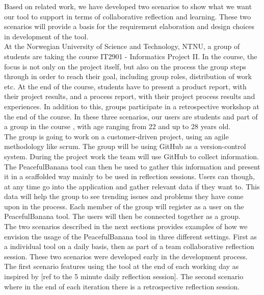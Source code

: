 Based on related work, we have developed two scenarios to show what we want our tool to support in terms of collaborative reflection and learning. These two scenarios will provide a basis for the requirement elaboration and design choices in development of the tool. 
\\
At the Norwegian University of Science and Technology, NTNU, a group of students are taking the course IT2901 - Informatics Project II\footnotemark.
In the course, the focus is not only on the project itself, but also on the process the group steps through in order to reach their goal, including group roles, distribution of work etc. At the end of the course, students have to present a product report, with their project results, and a process report, with their project process results and experiences. In addition to this, groups participate in a retrospective workshop at the end of the course. In these three scenarios, our users are students and part of a group in the course , with age ranging from 22 and up to 28 years old.
\\
The group is going to work on a customer-driven project, using an agile methodology like scrum. The group will be using GitHub as a version-control system. During the project work the team will use GitHub to collect information. The PeacefulBanana tool can then be used to gather this information and present it in a scaffolded way mainly to be used in reflection sessions. Users can though, at any time go into the application and gather relevant data if they want to. This data will help the group to see trending issues and problems they have come upon in the process. Each member of the group will register as a user on the PeacefulBanana tool. The users will then be connected together as a group. 
\\
The two scenarios described in the next sections provides examples of how we envision the usage of the PeacefulBanana tool in three different settings. First as a individual tool on a daily basis, then as part of a team collaborative reflection session.
These two scenarios were developed early in the development process. The first scenario features using the tool at the end of each working day as inspired by [ref to the 5 minute daily reflection session]. The second scenario where in the end of each iteration there is a retrospective reflection session. 
\\


